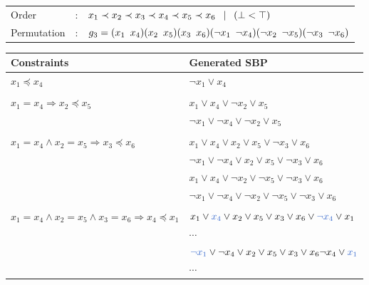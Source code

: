 \begin{center}
	\begin{tabular}{lll}
		Order &:& $ x_1 \prec x_2 \prec x_3 \prec x_4 \prec x_5 \prec x_6 \enskip \mid \enskip  (\bot < \top)$ \\
		Permutation &:& $g_3 = (x_1 \enskip x_4)(x_2 \enskip x_5)(x_3 \enskip x_6)(\neg x_1 \enskip \neg x_4)(\neg x_2 \enskip \neg x_5)(\neg x_3 \enskip \neg x_6)$
	\end{tabular}
	
	\vspace*{2\baselineskip}
	
	\begin{tabular}{ll}
		Constraints & Generated SBP\\
		\midrule
		$x_1 \preceq x_4$ & $ \neg x_1 \lor x_4$ \\
		&\\
		$x_1 = x_4 \Rightarrow x_2 \preceq x_5$ & $ x_1 \lor x_4 \lor \neg x_2 \lor x_5$\\
		&$ \neg x_1 \lor \neg x_4 \lor \neg x_2 \lor x_5$\\
		&\\
		$x_1 = x_4 \land x_2 = x_5 \Rightarrow x_3 \preceq x_6$ &
		  $ x_1 \lor x_4 \lor x_2 \lor x_5 \lor \neg x_3 \lor x_6$ \\
		& $ \neg x_1 \lor \neg x_4 \lor x_2 \lor x_5 \lor \neg x_3 \lor x_6$ \\
		& $ x_1 \lor x_4 \lor \neg x_2 \lor \neg x_5 \lor \neg x_3 \lor x_6$ \\
		& $ \neg x_1 \lor \neg x_4 \lor \neg x_2 \lor \neg x_5 \lor \neg x_3 \lor x_6$ \\ 
		&\\
		  $x_1 = x_4 \land x_2 = x_5 \land x_3 = x_6 \Rightarrow x_4 \preceq x_1$ &
		  $ x_1 \lor \textcolor{blue_1}{x_4} \lor x_2 \lor x_5 \lor  x_3 \lor x_6 \lor \textcolor{blue_1}{\neg x_4} \lor x_1$\\
		& $\cdots$ \\
		& $ \textcolor{blue_1}{\neg x_1} \lor \neg x_4 \lor  x_2 \lor x_5 \lor x_3 \lor x_6 \neg x_4 \lor \textcolor{blue_1}{x_1}$ \\ 
     	& $\cdots$ \\
	\end{tabular}
\end{center}





%
